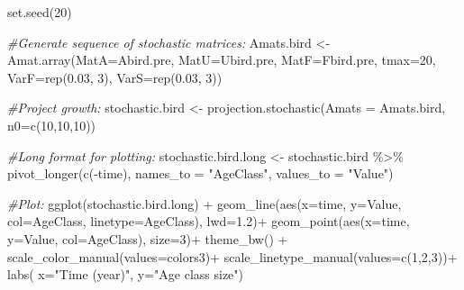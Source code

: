 \documentclass[
]{book}
\newenvironment{Shaded}{\begin{snugshade}}{\end{snugshade}}
\newcommand{\AttributeTok}[1]{\textcolor[rgb]{0.77,0.63,0.00}{#1}}
\newcommand{\CommentTok}[1]{\textcolor[rgb]{0.56,0.35,0.01}{\textit{#1}}}
\newcommand{\DecValTok}[1]{\textcolor[rgb]{0.00,0.00,0.81}{#1}}
\newcommand{\FloatTok}[1]{\textcolor[rgb]{0.00,0.00,0.81}{#1}}
\newcommand{\FunctionTok}[1]{\textcolor[rgb]{0.00,0.00,0.00}{#1}}
\newcommand{\NormalTok}[1]{#1}
\newcommand{\OtherTok}[1]{\textcolor[rgb]{0.56,0.35,0.01}{#1}}
\newcommand{\SpecialCharTok}[1]{\textcolor[rgb]{0.00,0.00,0.00}{#1}}
\newcommand{\StringTok}[1]{\textcolor[rgb]{0.31,0.60,0.02}{#1}}
\begin{document}
\begin{Shaded}
\begin{Highlighting}[]
\FunctionTok{set.seed}\NormalTok{(}\DecValTok{20}\NormalTok{)}

\CommentTok{\#Generate sequence of stochastic matrices:}
\NormalTok{Amats.bird }\OtherTok{\textless{}{-}} \FunctionTok{Amat.array}\NormalTok{(}\AttributeTok{MatA=}\NormalTok{Abird.pre, }\AttributeTok{MatU=}\NormalTok{Ubird.pre, }\AttributeTok{MatF=}\NormalTok{Fbird.pre, }\AttributeTok{tmax=}\DecValTok{20}\NormalTok{, }\AttributeTok{VarF=}\FunctionTok{rep}\NormalTok{(}\FloatTok{0.03}\NormalTok{, }\DecValTok{3}\NormalTok{), }\AttributeTok{VarS=}\FunctionTok{rep}\NormalTok{(}\FloatTok{0.03}\NormalTok{, }\DecValTok{3}\NormalTok{)) }

\CommentTok{\#Project growth:}
\NormalTok{stochastic.bird }\OtherTok{\textless{}{-}} \FunctionTok{projection.stochastic}\NormalTok{(}\AttributeTok{Amats =}\NormalTok{ Amats.bird, }\AttributeTok{n0=}\FunctionTok{c}\NormalTok{(}\DecValTok{10}\NormalTok{,}\DecValTok{10}\NormalTok{,}\DecValTok{10}\NormalTok{))}

\CommentTok{\#Long format for plotting:}
\NormalTok{stochastic.bird.long }\OtherTok{\textless{}{-}}\NormalTok{ stochastic.bird }\SpecialCharTok{\%\textgreater{}\%} \FunctionTok{pivot\_longer}\NormalTok{(}\FunctionTok{c}\NormalTok{(}\SpecialCharTok{{-}}\NormalTok{time),}
               \AttributeTok{names\_to =} \StringTok{"AgeClass"}\NormalTok{, }\AttributeTok{values\_to =} \StringTok{"Value"}\NormalTok{)}

\CommentTok{\#Plot:}
\FunctionTok{ggplot}\NormalTok{(stochastic.bird.long) }\SpecialCharTok{+} 
  \FunctionTok{geom\_line}\NormalTok{(}\FunctionTok{aes}\NormalTok{(}\AttributeTok{x=}\NormalTok{time, }\AttributeTok{y=}\NormalTok{Value, }\AttributeTok{col=}\NormalTok{AgeClass, }\AttributeTok{linetype=}\NormalTok{AgeClass), }\AttributeTok{lwd=}\FloatTok{1.2}\NormalTok{)}\SpecialCharTok{+}
  \FunctionTok{geom\_point}\NormalTok{(}\FunctionTok{aes}\NormalTok{(}\AttributeTok{x=}\NormalTok{time, }\AttributeTok{y=}\NormalTok{Value, }\AttributeTok{col=}\NormalTok{AgeClass), }\AttributeTok{size=}\DecValTok{3}\NormalTok{)}\SpecialCharTok{+}
  \FunctionTok{theme\_bw}\NormalTok{() }\SpecialCharTok{+}
  \FunctionTok{scale\_color\_manual}\NormalTok{(}\AttributeTok{values=}\NormalTok{colors3)}\SpecialCharTok{+} 
  \FunctionTok{scale\_linetype\_manual}\NormalTok{(}\AttributeTok{values=}\FunctionTok{c}\NormalTok{(}\DecValTok{1}\NormalTok{,}\DecValTok{2}\NormalTok{,}\DecValTok{3}\NormalTok{))}\SpecialCharTok{+}  
  \FunctionTok{labs}\NormalTok{( }\AttributeTok{x=}\StringTok{"Time (year)"}\NormalTok{, }\AttributeTok{y=}\StringTok{"Age class size"}\NormalTok{)  }
\end{Highlighting}
\end{Shaded}
\end{document}
